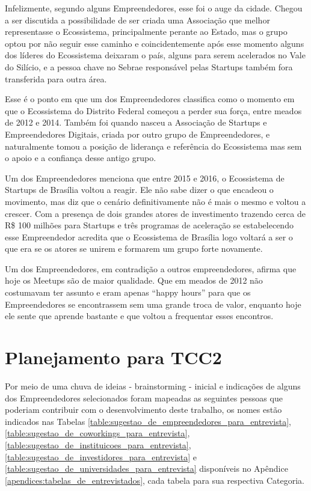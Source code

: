 Infelizmente, segundo alguns Empreendedores, esse foi o auge da cidade. Chegou a ser discutida a possibilidade de ser criada uma Associação que melhor representasse o Ecossistema, principalmente perante ao Estado, mas o grupo optou por não seguir esse caminho e coincidentemente após esse momento alguns dos líderes do Ecossistema deixaram o país, alguns para serem acelerados no Vale do Silício, e a pessoa chave no Sebrae responsável pelas Startups também fora transferida para outra área. 

Esse é o ponto em que um dos Empreendedores classifica como o momento em que o Ecossistema do Distrito Federal começou a perder sua força, entre meados de 2012 e 2014. Também foi quando nasceu a Associação de Startups e Empreendedores Digitais, criada por outro grupo de Empreendedores, e naturalmente tomou a posição de liderança e referência do Ecossistema mas sem o apoio e a confiança desse antigo grupo.

Um dos Empreendedores menciona que entre 2015 e 2016, o Ecossistema de Startups de Brasília voltou a reagir. Ele não sabe dizer o que encadeou o movimento, mas diz que o cenário definitivamente não é mais o mesmo e voltou a crescer. Com a presença de dois grandes atores de investimento trazendo cerca de R\$ 100 milhões para Startups e três programas de aceleração se estabelecendo esse Empreendedor acredita que o Ecossistema de Brasília logo voltará a ser o que era se os atores se unirem e formarem um grupo forte novamente.

Um dos Empreendedores, em contradição a outros empreendedores, afirma que hoje os Meetups são de maior qualidade. Que em meados de 2012 não costumavam ter assunto e eram apenas ``happy hours'' para que os Empreendedores se encontrassem sem uma grande troca de valor, enquanto hoje ele sente que aprende bastante e que voltou a frequentar esses encontros.

\section{Planejamento para TCC2}
\label{section:cronograma_tcc2}

Por meio de uma chuva de ideias - brainstorming - inicial e indicações de alguns dos Empreendedores selecionados foram mapeadas as seguintes pessoas que poderiam contribuir com o desenvolvimento deste trabalho, os nomes estão indicados nas Tabelas \ref{table:sugestao_de_empreendedores_para_entrevista}, \ref{table:sugestao_de_coworkings_para_entrevista}, \ref{table:sugestao_de_instituicoes_para_entrevista}, \ref{table:sugestao_de_investidores_para_entrevista} e \ref{table:sugestao_de_universidades_para_entrevista} disponíveis no Apêndice \ref{apendices:tabelas_de_entrevistados}, cada tabela para sua respectiva Categoria. 

